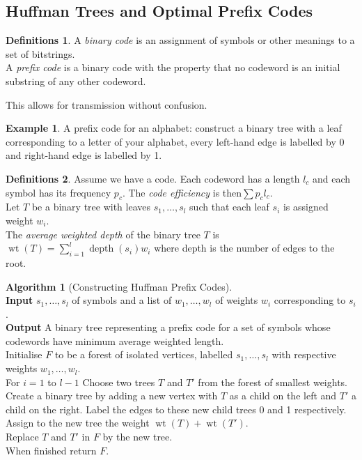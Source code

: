 \documentclass{article}
\theoremstyle{definition}
\newtheorem*{defns}{Definitions}
\newtheorem*{ex}{Example}
\newtheorem*{alg}{Algorithm}
\DeclareMathOperator{\wt}{wt}
\DeclareMathOperator{\depth}{depth}
\begin{document}
\subsection{Huffman Trees and Optimal Prefix Codes}

\begin{defns}
A \emph{binary code} is an assignment of symbols or other meanings to a set of bitstrings.\\
A \emph{prefix code} is a binary code with the property that no codeword is an initial substring of any other codeword.
\end{defns}

This allows for transmission without confusion.

\begin{ex}
A prefix code for an alphabet: construct a binary tree with a leaf corresponding to a letter of your alphabet, every left-hand edge is labelled by 0 and right-hand edge is labelled by 1.
\end{ex}


\begin{defns}
Assume we have a code.
Each codeword has a length $l_c$ and each symbol has its frequency $p_c$.
The \emph{code efficiency} is then$\sum p_cl_c$. \\
Let $T$ be a binary tree with leaves $s_1,\ldots,s_l$ such that each leaf $s_i$ is assigned weight $w_i$.\\
The \emph{average weighted depth} of the binary tree $T$ is $\wt(T) = \sum_{i=1}^l\depth(s_i)w_i$ where depth is the number of edges to the root.
\end{defns}

\begin{alg}[Constructing Huffman Prefix Codes]~\\
\textbf{Input} $s_1,\ldots,s_l$ of symbols and a list of $w_1,\ldots,w_l$ of weights $w_i$ corresponding to $s_i$.\\
\textbf{Output} A binary tree representing a prefix code for a set of symbols whose codewords have minimum average weighted length.\\
Initialise $F$ to be a forest of isolated vertices, labelled $s_1,\ldots,s_l$ with respective weights $w_1,\ldots, w_l$. \\
For $i=1$ to $l-1$ Choose two trees $T$ and $T'$ from the forest of smallest weights.\\
Create a binary tree by adding a new vertex with $T$ as a child on the left and $T'$ a child on the right. Label the edges to these new child trees 0 and 1 respectively. \\
Assign to the new tree the weight $\wt(T)+\wt(T')$. \\
Replace $T$ and $T'$ in $F$ by the new tree. \\
When finished return $F$.
\end{alg}
\end{document}
